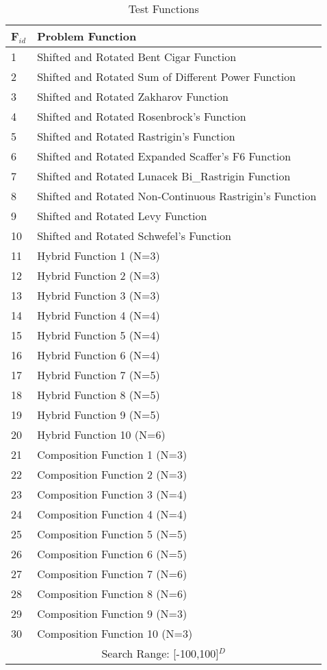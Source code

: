 \begin{table*}
\caption{Test Functions}
\vspace{-3mm}
\centering
\begin{tabular}{|p{0.7cm}|p{5.4cm}|}
\hline
F$_{id}$ & Problem Function \\ \hline
1 & Shifted and Rotated Bent Cigar Function \\
\hline
2 & Shifted and Rotated Sum of Different Power Function \\
\hline
3 & Shifted and Rotated Zakharov Function \\
\hline
4 & Shifted and Rotated Rosenbrock’s Function \\
\hline
5 & Shifted and Rotated Rastrigin’s Function \\
\hline
6 & Shifted and Rotated Expanded Scaffer’s F6 Function \\
\hline
7 & Shifted and Rotated Lunacek Bi\_Rastrigin Function \\
\hline
8 & Shifted and Rotated Non-Continuous Rastrigin’s Function \\
\hline
9 & Shifted and Rotated Levy Function \\
\hline
10 & Shifted and Rotated Schwefel’s Function \\
\hline
11 & Hybrid Function 1 (N=3) \\
\hline
12 & Hybrid Function 2 (N=3) \\
\hline
13 & Hybrid Function 3 (N=3) \\
\hline
14 & Hybrid Function 4 (N=4) \\
\hline
15 & Hybrid Function 5 (N=4) \\
\hline
16 & Hybrid Function 6 (N=4) \\
\hline
17 & Hybrid Function 7 (N=5) \\
\hline
18 & Hybrid Function 8 (N=5) \\
\hline
19 & Hybrid Function 9 (N=5) \\
\hline
20 & Hybrid Function 10 (N=6) \\
\hline
21 & Composition Function 1 (N=3) \\
\hline
22 & Composition Function 2 (N=3) \\
\hline
23 & Composition Function 3 (N=4) \\
\hline
24 & Composition Function 4 (N=4) \\
\hline
25 & Composition Function 5 (N=5) \\
\hline
26 & Composition Function 6 (N=5) \\
\hline
27 & Composition Function 7 (N=6) \\
\hline
28 & Composition Function 8 (N=6)  \\
\hline
29 & Composition Function 9 (N=3)  \\
\hline
30 & Composition Function 10 (N=3) \\
\hline
\multicolumn{2}{|c|}{Search Range: [-100,100]$^{D}$ }  \\
\hline
\end{tabular}
\vspace{-5mm}
\end{table*}